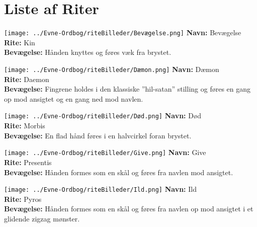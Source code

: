 \chapter*{Liste af Riter}
\begin{rite*}[Bevægelse]
    \centering
    \texttt{[image: ../Evne-Ordbog/riteBilleder/Bevægelse.png]}
\Large \textbf{Navn:} Bevægelse\\
\textbf{Rite:} Kin\\
\textbf{Bevægelse:} Hånden knyttes og føres væk fra brystet.\\
\end{rite*}

\begin{rite*}[Dæmon]
    \centering
    \texttt{[image: ../Evne-Ordbog/riteBilleder/Dæmon.png]}
\Large \textbf{Navn:} Dæmon\\
\textbf{Rite:} Daemon\\
\textbf{Bevægelse:} Fingrene holdes i den klassiske ”hil-satan” stilling og føres en gang op mod ansigtet og en gang ned mod navlen.
\end{rite*}

\begin{rite*}[Død]
    \centering
    \texttt{[image: ../Evne-Ordbog/riteBilleder/Død.png]}
\Large \textbf{Navn:} Død\\
\textbf{Rite:} Morbis\\
\textbf{Bevægelse:} En flad hånd føres i en halvcirkel foran brystet.
\end{rite*}

\begin{rite*}[Give]
    \centering
    \texttt{[image: ../Evne-Ordbog/riteBilleder/Give.png]}
\Large \textbf{Navn:} Give\\
\textbf{Rite:} Presentis\\
\textbf{Bevægelse:} Hånden formes som en skål og føres fra navlen mod ansigtet.
\end{rite*}

\begin{rite*}[Ild]
    \centering
    \texttt{[image: ../Evne-Ordbog/riteBilleder/Ild.png]}
\Large \textbf{Navn:} Ild\\
\textbf{Rite:} Pyros\\
\textbf{Bevægelse:} Hånden formes som en skål og føres fra navlen op mod ansigtet i et glidende zigzag mønster.
\end{rite*}

